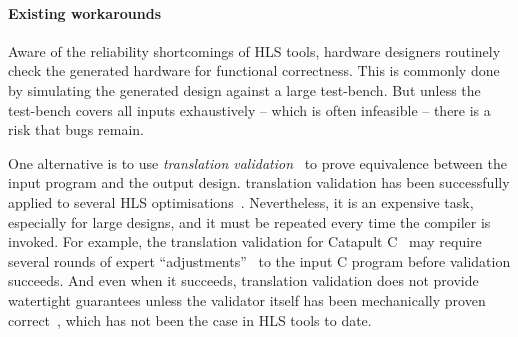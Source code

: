 \paragraph{Existing workarounds}

Aware of the reliability shortcomings of \gls{HLS} tools, hardware designers
routinely check the generated hardware for functional correctness.  This is
commonly done by simulating the generated design against a large test-bench.
But unless the test-bench covers all inputs exhaustively -- which is often
infeasible -- there is a risk that bugs remain.

One alternative is to use \emph{\gls{translation
    validation}}~\cite{pnueli98_trans} to prove equivalence between the input
program and the output design. \Gls{translation validation} has been
successfully applied to several \gls{HLS} optimisations~\cite{kim04_autom_fsmd,
  karfa06_formal_verif_method_sched_high_synth,
  chouksey20_verif_sched_condit_behav_high_level_synth,
  banerjee14_verif_code_motion_techn_using_value_propag,
  chouksey19_trans_valid_code_motion_trans_invol_loops}.  Nevertheless, it is an
expensive task, especially for large designs, and it must be repeated every time
the compiler is invoked.  For example, the translation validation for Catapult
C~\cite{mentor20_catap_high_level_synth} may require several rounds of expert
\enquote{adjustments}~\cite[p.~3]{chauhan20_formal_ensur_equiv_c_rtl} to the
input C program before validation succeeds. And even when it succeeds,
translation validation does not provide watertight guarantees unless the
validator itself has been mechanically proven
correct~\cite[e.g.][]{tristan08_formal_verif_trans_valid}, which has not been
the case in \gls{HLS} tools to date.


